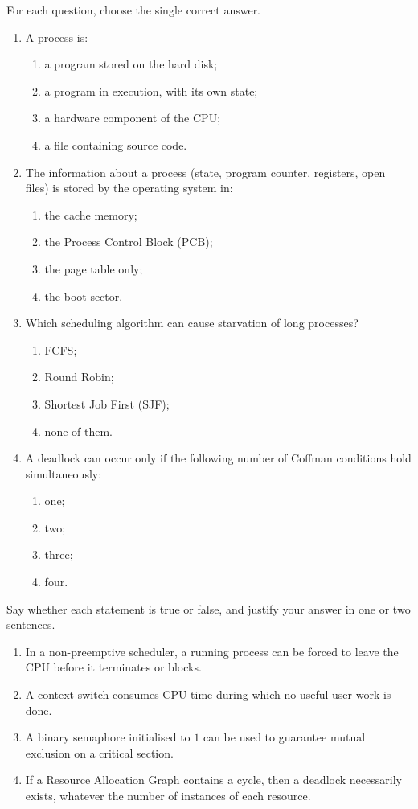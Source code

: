\documentclass[11pt]{article}
\newcommand{\cle}[1]{{\popxbold\color{popdark}#1}}
\begin{document}
\begin{exercice}
For each question, choose the single correct answer.
\begin{enumerate}
\item A \cle{process} is:
\begin{enumerate}
\item a program stored on the hard disk;
\item a program in execution, with its own state;
\item a hardware component of the CPU;
\item a file containing source code.
\end{enumerate}
\item The information about a process (state, program counter, registers, open files) is stored by the operating system in:
\begin{enumerate}
\item the cache memory;
\item the \cle{Process Control Block} (PCB);
\item the page table only;
\item the boot sector.
\end{enumerate}
\item Which scheduling algorithm can cause \cle{starvation} of long processes?
\begin{enumerate}
\item FCFS;
\item Round Robin;
\item Shortest Job First (SJF);
\item none of them.
\end{enumerate}
\item A deadlock can occur only if the following number of Coffman conditions hold simultaneously:
\begin{enumerate}
\item one; \item two; \item three; \item four.
\end{enumerate}
\end{enumerate}
\end{exercice}

\begin{exercice}
Say whether each statement is true or false, and justify your answer in one or two sentences.
\begin{enumerate}
\item In a non-preemptive scheduler, a running process can be forced to leave the CPU before it terminates or blocks.
\item A context switch consumes CPU time during which no useful user work is done.
\item A binary semaphore initialised to $1$ can be used to guarantee mutual exclusion on a critical section.
\item If a Resource Allocation Graph contains a cycle, then a deadlock necessarily exists, whatever the number of instances of each resource.
\end{enumerate}
\end{exercice}
\end{document}
